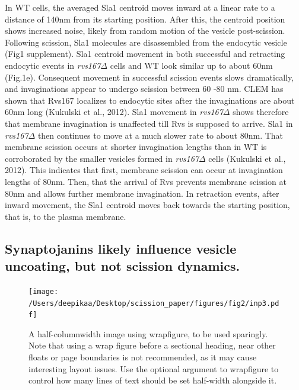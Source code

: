 \documentclass[9pt,lineno]{elife}
\begin{document}
In WT cells, the averaged Sla1 centroid moves inward at a linear rate to a distance of 140nm from its starting position. After this, the centroid position shows increased noise, likely from random motion of the vesicle post-scission. Following scission, Sla1 molecules are disassembled from the endocytic vesicle (Fig1 supplement). Sla1 centroid movement in both successful and retracting endocytic events in \textit{rvs167$\Delta$} cells and WT look similar up to about 60nm (Fig.1e).  Consequent movement in successful scission events slows dramatically, and invaginations appear to undergo scission between 60 -80 nm. CLEM has shown that Rvs167 localizes to endocytic sites after the invaginations are about 60nm long (Kukulski et al., 2012). Sla1 movement in \textit{rvs167$\Delta$}  shows therefore that membrane invagination is unaffected till Rvs is supposed to arrive. Sla1 in \textit{rvs167$\Delta$}  then continues to move at a much slower rate to about 80nm. That membrane scission occurs at shorter invagination lengths than in WT is corroborated by the smaller vesicles formed in \textit{rvs167$\Delta$} cells (Kukulski et al., 2012). This indicates that first, membrane scission can occur at invagination lengths of 80nm. Then, that the arrival of Rvs prevents membrane scission at 80nm and allows further membrane invagination. In retraction events, after inward movement, the Sla1 centroid moves back towards the starting position, that is, to the plasma membrane. 





\subsection{Synaptojanins likely influence vesicle uncoating, but not scission dynamics.}


\begin{figure}[h]
	\texttt{[image: /Users/deepikaa/Desktop/scission\_paper/figures/fig2/inp3.pdf]}
	\caption{A half-columnwidth image using wrapfigure, to be used sparingly. Note that using a wrap figure before a sectional heading, near other floats or page boundaries is not recommended, as it may cause interesting layout issues. Use the optional argument to wrapfigure to control how many lines of text should be set half-width alongside it.}
	\label{fig:halfwidth}
\end{figure}
\end{document}
